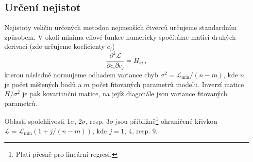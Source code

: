 \subsection*{Určení nejistot}

Nejistoty veličin určených metodou nejmenších čtverců určujeme standardním způsobem\cite{gelmanBayesianDataAnalysis2014}.
V okolí minima cílové funkce numericky spočítáme matici druhých derivací (zde určujeme koeficienty $c_i$)
\begin{equation}
    \frac{\partial^2 \mathcal{L}}{\partial c_i \partial c_j} = H_{ij} \,,
\end{equation}
kterou následně normujeme odhadem variance chyb $\sigma^2 = \mathcal{L}_\textrm{min}/(n-m)$, kde $n$ je počet měřených bodů a $m$ počet fitovaných parametrů modelu.
Inverzí matice $H/\sigma^2$ je pak kovarianční matice, na jejíž diagonále jsou variance fitovaných parametrů.

Oblasti spolehlivosti $1\sigma$, $2\sigma$, resp. $3\sigma$ jsou přibližně\footnote{Platí přesně pro lineární regresi.} ohraničené křivkou $\mathcal{L}=\mathcal{L}_\textrm{min}(1+j/(n-m))$, kde $j=1$, $4$, resp. $9$.
